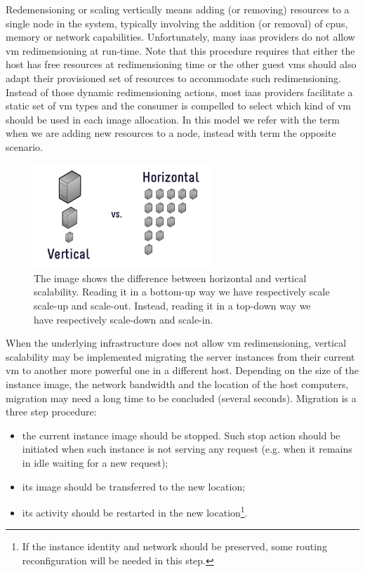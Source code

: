 Redemensioning or scaling vertically means adding (or removing) resources to a single node in the system,
typically involving the addition (or removal) of \acs{cpu}s, memory or network capabilities. Unfortunately,
many \ac{iaas} providers do not allow \ac{vm} redimensioning at run-time. Note that this procedure requires
that either the host has free resources at redimensioning time or the other guest \ac{vm}s should also adapt
their provisioned set of resources to accommodate such redimensioning. Instead of those dynamic redimensioning
actions, most \ac{iaas} providers facilitate a static set of \ac{vm} types and the consumer is compelled 
to select which kind of \ac{vm} should be used in each image allocation. In this model we refer with the term
 when we are adding new resources to a node, instead with term  the
opposite scenario.

\begin{figure}
	\centering{}
	\includegraphics[width=0.6\textwidth]{chapters/elasticity/images/horizontal-vs-vertical-scaling.png}
	\caption[Difference between horizontal and vertical scalability]{The image shows the difference between
		horizontal and vertical scalability. Reading it in a bottom-up way we have respectively scale scale-up
		and scale-out. Instead, reading it in a top-down way we have respectively scale-down and scale-in.}
	\label{img:solutionSpace-elasticity-availableTypes}
\end{figure}

When the underlying infrastructure does not allow \ac{vm} redimensioning, vertical scalability may be
implemented migrating the server instances from their current \ac{vm} to another more powerful one in a 
different host. Depending on the size of the instance image, the network bandwidth and the location of
the host computers, migration may need a long time to be concluded (several seconds). Migration is a
three step procedure:

\begin{itemize}
	\item{the current instance image should be stopped. Such stop action should be initiated when such
		instance is not serving any request (e.g. when it remains in idle waiting for a new request);}
	\item{its image should be transferred to the new location;}
	\item{its activity should be restarted in the new location\footnote{If the instance identity and
		network should be preserved, some routing reconfiguration will be needed in this step.}.}
\end{itemize}

